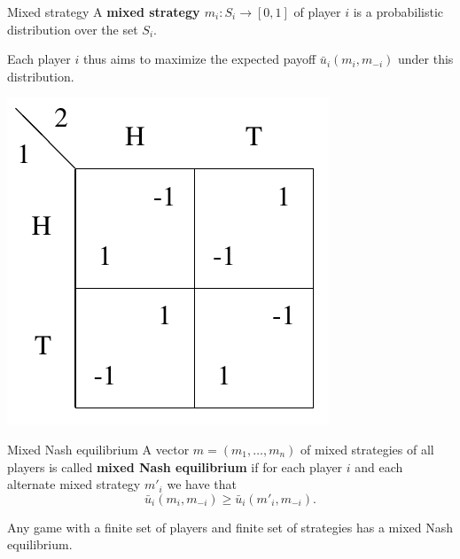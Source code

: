 \documentclass{beamer}
\begin{document}
\begin{frame}{Mixed strategy}
  A {\bf mixed strategy $m_i:S_i\to[0,1]$} of player $i$ is a probabilistic
  distribution over the set $S_i$.
  \pause

  Each player $i$ thus aims to maximize the expected payoff $\bar u_i(m_i, m_{-i})$
  under this distribution.

  \pause
  \begin{center}
    \includegraphics[width=\textwidth,height=0.6\textheight,keepaspectratio]{img/matching-pennies.png}
  \end{center}
\end{frame}

\begin{frame}{Mixed Nash equilibrium}
  A vector $m=(m_1,\dots,m_n)$ of mixed strategies of all players is called
  {\bf mixed Nash equilibrium} if for each player $i$ and each alternate mixed
  strategy $m'_i$ we have that 
  \[\bar u_i(m_i,m_{-i})\ge \bar u_i(m'_i,m_{-i}).\]
  \pause

  \begin{theorem}[Nash, 1951]
    Any game with a finite set of players and finite set of strategies has a
    mixed Nash equilibrium.
  \end{theorem}

\end{frame}
\end{document}
